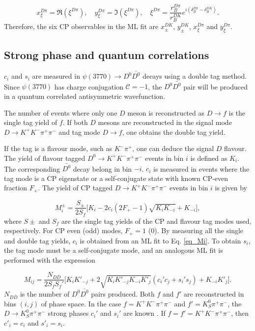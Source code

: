 \documentclass[12pt, a4paper, notitlepage, onecolumn]{article}
\numberwithin{equation}{section}
\begin{document}
\begin{equation}
  x_\xi^{D\pi} = \Re(\xi^{D\pi}), \quad y_\xi^{D\pi} = \Im(\xi^{D\pi}), \quad \xi^{D\pi} = \frac{r_B^{D\pi}}{r_B^{DK}}e^{i(\delta_B^{D\pi} - \delta_B^{DK})}.
\end{equation}
Therefore, the six CP observables in the ML fit are $x_\pm^{DK}$, $y_\pm^{DK}$, $x_\xi^{D\pi}$ and $y_\xi^{D\pi}$.

\subsection{Strong phase and quantum correlations}
$c_i$ and $s_i$ are measured in $\psi(3770)\to D^0\bar{D^0}$ decays using a double tag method. Since $\psi(3770)$ has charge conjugation $\mathcal{C} = -1$, the $D^0\bar{D^0}$ pair will be produced in a quantum correlated antisymmetric wavefunction.

The number of events where only one $D$ meson is reconstructed as $D\to f$ is the single tag yield of $f$. If both $D$ mesons are reconstructed in the signal mode $D\to K^+K^-\pi^+\pi^-$ and tag mode $D\to f$, one obtains the double tag yield.

If the tag is a flavour mode, such as $K^-\pi^+$, one can deduce the signal $D$ flavour. The yield of flavour tagged $D^0\to K^+K^-\pi^+\pi^-$ events in bin $i$ is defined as $K_i$. The corresponding $\bar{D^0}$ decay belong in bin $-i$. $c_i$ is measured in events where the tag mode is a CP eigenstate or a self-conjugate state with known CP-even fraction $F_+$. The yield of CP tagged $D\to K^+K^-\pi^+\pi^-$ events in bin $i$ is given by

\begin{equation}
  M_i^\pm = \frac{S_\pm}{2S_f}\Big[K_i - 2c_i(2F_+ - 1)\sqrt{K_iK_{-i}} + K_{-i}\Big],
  \label{eq_Mi}
\end{equation}
where $S\pm$ and $S_f$ are the single tag yields of the CP and flavour tag modes used, respectively. For CP even (odd) modes, $F_+ = 1$ ($0$). By measuring all the single and double tag yields, $c_i$ is obtained from an ML fit to Eq. \eqref{eq_Mi}. To obtain $s_i$, the tag mode must be a self-conjugate mode, and an analogous ML fit is performed with the expression

\begin{equation}
  M_{ij} = \frac{N_{D\bar{D}}}{2S_fS_f'}\Big[K_iK'_{-j} + 2\sqrt{K_iK'_{-j}K_{-i}K'_j}(c_i'c_j + s_i's_j) + K_{-i}K'_j\Big].
  \label{eq_Mij}
\end{equation}
$N_{D\bar{D}}$ is the number of $D^0\bar{D^0}$ pairs produced. Both $f$ and $f'$ are reconstructed in bins $(i, j)$ of phase space. In the case $f = K^+K^-\pi^+\pi^-$ and $f' = K_S^0\pi^+\pi^-$, the $D\to K_S^0\pi^+\pi^-$ strong phases $c_i'$ and $s_i'$ are known \cite{cite_KSKKAnalysis}. If $f = f' = K^+K^-\pi^+\pi^-$, then $c'_i = c_i$ and $s'_i = s_i$.
\end{document}
